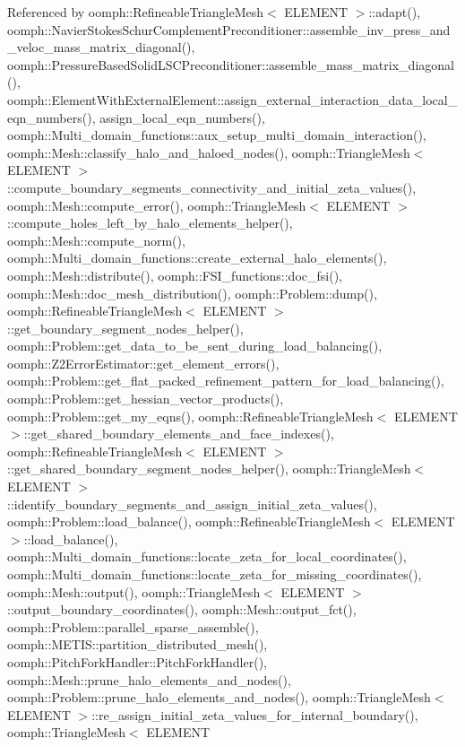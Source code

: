 Referenced by oomph\+::\+Refineable\+Triangle\+Mesh$<$ E\+L\+E\+M\+E\+N\+T $>$\+::adapt(), oomph\+::\+Navier\+Stokes\+Schur\+Complement\+Preconditioner\+::assemble\+\_\+inv\+\_\+press\+\_\+and\+\_\+veloc\+\_\+mass\+\_\+matrix\+\_\+diagonal(), oomph\+::\+Pressure\+Based\+Solid\+L\+S\+C\+Preconditioner\+::assemble\+\_\+mass\+\_\+matrix\+\_\+diagonal(), oomph\+::\+Element\+With\+External\+Element\+::assign\+\_\+external\+\_\+interaction\+\_\+data\+\_\+local\+\_\+eqn\+\_\+numbers(), assign\+\_\+local\+\_\+eqn\+\_\+numbers(), oomph\+::\+Multi\+\_\+domain\+\_\+functions\+::aux\+\_\+setup\+\_\+multi\+\_\+domain\+\_\+interaction(), oomph\+::\+Mesh\+::classify\+\_\+halo\+\_\+and\+\_\+haloed\+\_\+nodes(), oomph\+::\+Triangle\+Mesh$<$ E\+L\+E\+M\+E\+N\+T $>$\+::compute\+\_\+boundary\+\_\+segments\+\_\+connectivity\+\_\+and\+\_\+initial\+\_\+zeta\+\_\+values(), oomph\+::\+Mesh\+::compute\+\_\+error(), oomph\+::\+Triangle\+Mesh$<$ E\+L\+E\+M\+E\+N\+T $>$\+::compute\+\_\+holes\+\_\+left\+\_\+by\+\_\+halo\+\_\+elements\+\_\+helper(), oomph\+::\+Mesh\+::compute\+\_\+norm(), oomph\+::\+Multi\+\_\+domain\+\_\+functions\+::create\+\_\+external\+\_\+halo\+\_\+elements(), oomph\+::\+Mesh\+::distribute(), oomph\+::\+F\+S\+I\+\_\+functions\+::doc\+\_\+fsi(), oomph\+::\+Mesh\+::doc\+\_\+mesh\+\_\+distribution(), oomph\+::\+Problem\+::dump(), oomph\+::\+Refineable\+Triangle\+Mesh$<$ E\+L\+E\+M\+E\+N\+T $>$\+::get\+\_\+boundary\+\_\+segment\+\_\+nodes\+\_\+helper(), oomph\+::\+Problem\+::get\+\_\+data\+\_\+to\+\_\+be\+\_\+sent\+\_\+during\+\_\+load\+\_\+balancing(), oomph\+::\+Z2\+Error\+Estimator\+::get\+\_\+element\+\_\+errors(), oomph\+::\+Problem\+::get\+\_\+flat\+\_\+packed\+\_\+refinement\+\_\+pattern\+\_\+for\+\_\+load\+\_\+balancing(), oomph\+::\+Problem\+::get\+\_\+hessian\+\_\+vector\+\_\+products(), oomph\+::\+Problem\+::get\+\_\+my\+\_\+eqns(), oomph\+::\+Refineable\+Triangle\+Mesh$<$ E\+L\+E\+M\+E\+N\+T $>$\+::get\+\_\+shared\+\_\+boundary\+\_\+elements\+\_\+and\+\_\+face\+\_\+indexes(), oomph\+::\+Refineable\+Triangle\+Mesh$<$ E\+L\+E\+M\+E\+N\+T $>$\+::get\+\_\+shared\+\_\+boundary\+\_\+segment\+\_\+nodes\+\_\+helper(), oomph\+::\+Triangle\+Mesh$<$ E\+L\+E\+M\+E\+N\+T $>$\+::identify\+\_\+boundary\+\_\+segments\+\_\+and\+\_\+assign\+\_\+initial\+\_\+zeta\+\_\+values(), oomph\+::\+Problem\+::load\+\_\+balance(), oomph\+::\+Refineable\+Triangle\+Mesh$<$ E\+L\+E\+M\+E\+N\+T $>$\+::load\+\_\+balance(), oomph\+::\+Multi\+\_\+domain\+\_\+functions\+::locate\+\_\+zeta\+\_\+for\+\_\+local\+\_\+coordinates(), oomph\+::\+Multi\+\_\+domain\+\_\+functions\+::locate\+\_\+zeta\+\_\+for\+\_\+missing\+\_\+coordinates(), oomph\+::\+Mesh\+::output(), oomph\+::\+Triangle\+Mesh$<$ E\+L\+E\+M\+E\+N\+T $>$\+::output\+\_\+boundary\+\_\+coordinates(), oomph\+::\+Mesh\+::output\+\_\+fct(), oomph\+::\+Problem\+::parallel\+\_\+sparse\+\_\+assemble(), oomph\+::\+M\+E\+T\+I\+S\+::partition\+\_\+distributed\+\_\+mesh(), oomph\+::\+Pitch\+Fork\+Handler\+::\+Pitch\+Fork\+Handler(), oomph\+::\+Mesh\+::prune\+\_\+halo\+\_\+elements\+\_\+and\+\_\+nodes(), oomph\+::\+Problem\+::prune\+\_\+halo\+\_\+elements\+\_\+and\+\_\+nodes(), oomph\+::\+Triangle\+Mesh$<$ E\+L\+E\+M\+E\+N\+T $>$\+::re\+\_\+assign\+\_\+initial\+\_\+zeta\+\_\+values\+\_\+for\+\_\+internal\+\_\+boundary(), oomph\+::\+Triangle\+Mesh$<$ E\+L\+E\+M\+E\+N\+T 